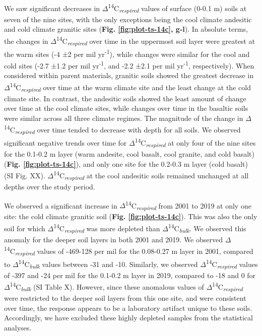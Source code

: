 \documentclass[english,man,floatsintext]{apa6}
\begin{document}
We saw significant decreases in \(\Delta\)\textsuperscript{14}C\textsubscript{\emph{respired}} values of surface (0-0.1 m) soils at seven of the nine sites, with the only exceptions being the cool climate andesitic and cold climate granitic sites (\textbf{Fig. \ref{fig:plot-ts-14c}, g-l}). In absolute terms, the changes in \(\Delta\)\textsuperscript{14}C\textsubscript{\emph{respired}} over time in the uppermost soil layer were greatest at the warm sites (-4 ±2 per mil yr\textsuperscript{-1}), while changes were similar for the cool and cold sites (-2.7 ±1.2 per mil yr\textsuperscript{-1}, and -2.2 ±2.1 per mil yr\textsuperscript{-1}, respectively). When considered within parent materials, granitic soils showed the greatest decrease in \(\Delta\)\textsuperscript{14}C\textsubscript{\emph{respired}} over time at the warm climate site and the least change at the cold climate site. In contrast, the andesitic soils showed the least amount of change over time at the cool climate sites, while changes over time in the basaltic soils were similar across all three climate regimes. The magnitude of the change in \(\Delta\)\textsuperscript{14}C\textsubscript{\emph{respired}} over time tended to decrease with depth for all soils. We observed significant negative trends over time for \(\Delta\)\textsuperscript{14}C\textsubscript{\emph{respired}} at only four of the nine sites for the 0.1-0.2 m layer (warm andesite, cool basalt, cool granite, and cold basalt) (\textbf{Fig. \ref{fig:plot-ts-14c}}), and only one site for the 0.2-0.3 m layer (cold basalt) (SI Fig. XX). \(\Delta\)\textsuperscript{14}C\textsubscript{\emph{respired}} at the cool andesitic soils remained unchanged at all depths over the study period.

We observed a significant increase in \(\Delta\)\textsuperscript{14}C\textsubscript{\emph{respired}} from 2001 to 2019 at only one site: the cold climate granitic soil (\textbf{Fig. \ref{fig:plot-ts-14c}}). This was also the only soil for which \(\Delta\)\textsuperscript{14}C\textsubscript{\emph{respired}} was more depleted than \(\Delta\)\textsuperscript{14}C\textsubscript{\emph{bulk}}. We observed this anomaly for the deeper soil layers in both 2001 and 2019. We observed \(\Delta\)\textsuperscript{14}C\textsubscript{\emph{respired}} values of -469-128 per mil for the 0.08-0.27 m layer in 2001, compared to \(\Delta\)\textsuperscript{14}C\textsubscript{\emph{bulk}} values between -31 and -10. Similarly, we observed \(\Delta\)\textsuperscript{14}C\textsubscript{\emph{respired}} values of -397 and -24 per mil for the 0.1-0.2 m layer in 2019, compared to -18 and 0 for \(\Delta\)\textsuperscript{14}C\textsubscript{\emph{bulk}} (SI Table X). However, since these anomalous values of \(\Delta\)\textsuperscript{14}C\textsubscript{\emph{respired}} were restricted to the deeper soil layers from this one site, and were consistent over time, the response appears to be a laboratory artifact unique to these soils. Accordingly, we have excluded these highly depleted samples from the statistical analyses.
\end{document}
